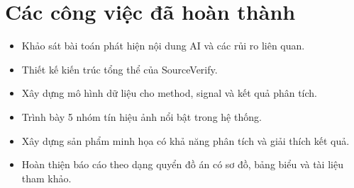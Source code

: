 \section{Các công việc đã hoàn thành}
\begin{itemize}
  \item Khảo sát bài toán phát hiện nội dung AI và các rủi ro liên quan.
  \item Thiết kế kiến trúc tổng thể của SourceVerify.
  \item Xây dựng mô hình dữ liệu cho method, signal và kết quả phân tích.
  \item Trình bày 5 nhóm tín hiệu ảnh nổi bật trong hệ thống.
  \item Xây dựng sản phẩm minh họa có khả năng phân tích và giải thích kết quả.
  \item Hoàn thiện báo cáo theo dạng quyển đồ án có sơ đồ, bảng biểu và tài liệu tham khảo.
\end{itemize}
